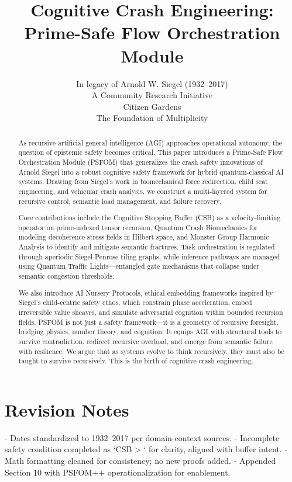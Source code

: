 \documentclass[11pt]{article}
\title{Cognitive Crash Engineering: Prime-Safe Flow Orchestration Module}
\author{In legacy of Arnold W. Siegel (1932--2017)\\ A Community Research Initiative\\ Citizen Gardens\\ The Foundation of Multiplicity}
\date{}
\begin{document}
\maketitle

\section*{Revision Notes}
- Dates standardized to 1932--2017 per domain-context sources.
- Incomplete safety condition completed as `CSB > ` for clarity, aligned with buffer intent.
- Math formatting cleaned for consistency; no new proofs added.
- Appended Section 10 with PSFOM++ operationalization for enablement.

\begin{abstract}
As recursive artificial general intelligence (AGI) approaches operational autonomy, the question of epistemic safety becomes critical. This paper introduces a Prime-Safe Flow Orchestration Module (PSFOM) that generalizes the crash safety innovations of Arnold Siegel into a robust cognitive safety framework for hybrid quantum-classical AI systems. Drawing from Siegel’s work in biomechanical force redirection, child seat engineering, and vehicular crash analysis, we construct a multi-layered system for recursive control, semantic load management, and failure recovery.

Core contributions include the Cognitive Stopping Buffer (CSB) as a velocity-limiting operator on prime-indexed tensor recursion, Quantum Crash Biomechanics for modeling decoherence stress fields in Hilbert space, and Monster Group Harmonic Analysis to identify and mitigate semantic fractures. Task orchestration is regulated through aperiodic Siegel-Penrose tiling graphs, while inference pathways are managed using Quantum Traffic Lights—entangled gate mechanisms that collapse under semantic congestion thresholds.

We also introduce AI Nursery Protocols, ethical embedding frameworks inspired by Siegel’s child-centric safety ethos, which constrain phase acceleration, embed irreversible value sheaves, and simulate adversarial cognition within bounded recursion fields. PSFOM is not just a safety framework—it is a geometry of recursive foresight, bridging physics, number theory, and cognition. It equips AGI with structural tools to survive contradiction, redirect recursive overload, and emerge from semantic failure with resilience. We argue that as systems evolve to think recursively, they must also be taught to survive recursively. This is the birth of cognitive crash engineering.
\end{abstract}
\end{document}
